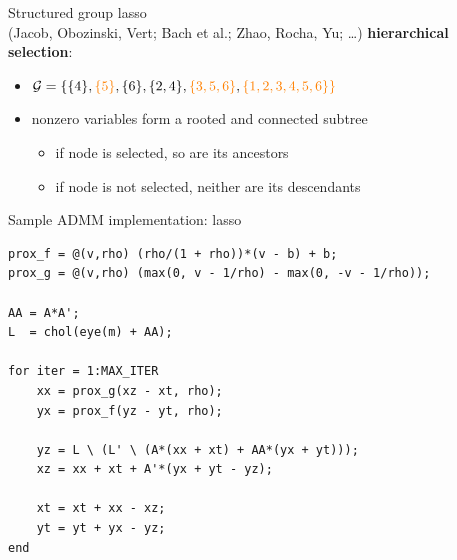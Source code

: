 \documentclass[10pt,tgadventor, onlymath]{beamer}
\begin{document}
\begin{frame}{Structured group lasso \\[-0.3em] 
{\footnotesize \textmd{(Jacob, Obozinski, Vert; Bach et al.; Zhao, Rocha, Yu; \dots)}}}
\textbf{hierarchical selection}:
\begin{center}
\end{center}
\begin{itemize}\itemsep=8pt
    \item $\mathcal G = \{ \{4\}, \textcolor{orange}{\{5\}}, \{6\}, \{2,4\}, 
        \textcolor{orange}{\{3,5,6\}}, \textcolor{orange}{\{1,2,3,4,5,6\} \}}$
\item nonzero variables form a rooted and connected subtree
    \begin{itemize}
        \item if node is selected, so are its ancestors
        \item if node is not selected, neither are its descendants
    \end{itemize}
\end{itemize}
\end{frame}

\begin{frame}[fragile]{Sample ADMM implementation: lasso}
\begin{verbatim}
prox_f = @(v,rho) (rho/(1 + rho))*(v - b) + b;
prox_g = @(v,rho) (max(0, v - 1/rho) - max(0, -v - 1/rho));

AA = A*A';
L  = chol(eye(m) + AA);

for iter = 1:MAX_ITER
    xx = prox_g(xz - xt, rho);
    yx = prox_f(yz - yt, rho);

    yz = L \ (L' \ (A*(xx + xt) + AA*(yx + yt)));
    xz = xx + xt + A'*(yx + yt - yz);
  
    xt = xt + xx - xz;
    yt = yt + yx - yz;
end
\end{verbatim}
\end{frame}
\end{document}
